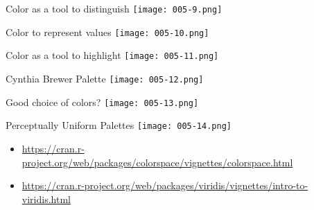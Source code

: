 \documentclass[10pt,handout]{beamer}\usepackage[]{graphicx}\usepackage[]{color}
\begin{document}
	\begin{frame}{Color as a tool to distinguish}
	\centering
	\texttt{[image: 005-9.png]}
\end{frame}


	\begin{frame}{Color to represent values}
	\centering
	\texttt{[image: 005-10.png]}
\end{frame}


	\begin{frame}{Color as a tool to highlight}
	\centering
	\texttt{[image: 005-11.png]}
\end{frame}



	\begin{frame}{Cynthia Brewer Palette}
	\centering
	\texttt{[image: 005-12.png]}
\end{frame}


	\begin{frame}{Good choice of colors?}
	\centering
	\texttt{[image: 005-13.png]}
\end{frame}




	\begin{frame}{Perceptually Uniform Palettes}
	\centering
	\texttt{[image: 005-14.png]}
	
	\begin{itemize}
		\item \url{https://cran.r-project.org/web/packages/colorspace/vignettes/colorspace.html}
		\item \url{https://cran.r-project.org/web/packages/viridis/vignettes/intro-to-viridis.html}
	\end{itemize}
\end{frame}
\end{document}

